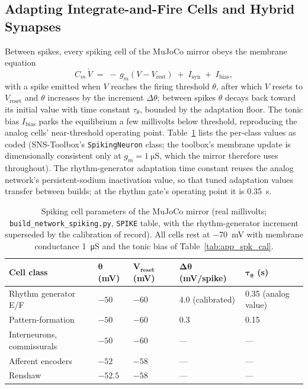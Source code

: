 \subsection{Adapting Integrate-and-Fire Cells and Hybrid Synapses}

Between spikes, every spiking cell of the MuJoCo mirror obeys the membrane equation
\begin{equation}
    C_{m}\,\dot{V} \;=\; -\,g_{m}\left(V - V_{\text{rest}}\right)
        \;+\; I_{\text{syn}} \;+\; I_{\text{bias}},
    \label{eq:app_lif}
\end{equation}
with a spike emitted when $V$ reaches the firing threshold $\theta$, after which $V$ resets to $V_{\text{reset}}$ and $\theta$ increases by the increment $\Delta\theta$; between spikes $\theta$ decays back toward its initial value with time constant $\tau_{\theta}$, bounded by the adaptation floor. The tonic bias $I_{\text{bias}}$ parks the equilibrium a few millivolts below threshold, reproducing the analog cells' near-threshold operating point. Table~\ref{tab:app_spk_cells} lists the per-class values as coded (SNS-Toolbox's \texttt{SpikingNeuron} class; the toolbox's membrane update is dimensionally consistent only at $g_{m} = \qty{1}{\micro\siemens}$, which the mirror therefore uses throughout). The rhythm-generator adaptation time constant reuses the analog network's persistent-sodium inactivation value, so that tuned adaptation values transfer between builds; at the rhythm gate's operating point it is \qty{0.35}{\second}.

\begin{table}[htbp]
\caption{Spiking cell parameters of the MuJoCo mirror (real millivolts; \texttt{build\_network\_spiking.py}, \texttt{SPIKE} table, with the rhythm-generator increment superseded by the calibration of record). All cells rest at \qty{-70}{\mV} with membrane conductance \qty{1}{\micro\siemens} and the tonic bias of Table~\ref{tab:app_spk_cal}.}
\label{tab:app_spk_cells}
\begin{tabular}{@{}lllll@{}}
\toprule
\textbf{Cell class} & $\boldsymbol{\theta}$ \textbf{(mV)} & $\boldsymbol{V_{\text{reset}}}$ \textbf{(mV)} & $\boldsymbol{\Delta\theta}$ \textbf{(mV/spike)} & $\boldsymbol{\tau_{\theta}}$ \textbf{(s)} \\
\midrule
Rhythm generator E/F & $-50$ & $-60$ & 4.0 (calibrated) & 0.35 (analog value) \\
Pattern-formation     & $-50$ & $-60$ & 0.3 & 0.15 \\
Interneurons, commissurals & $-50$ & $-60$ & --- & --- \\
Afferent encoders     & $-52$ & $-58$ & --- & --- \\
Renshaw               & $-52.5$ & $-58$ & --- & --- \\
\bottomrule
\end{tabular}
\end{table}

